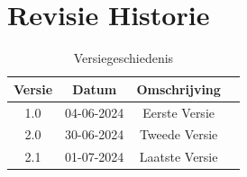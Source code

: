 \documentclass{article}
\begin{document}
  \tableofcontents
  \pagebreak 

  \section{Revisie Historie}
  \begin{table}[h]
      \centering
      \begin{tabular}{|c|c|c|p{5cm}|}
          \hline
          \textbf{Versie} & \textbf{Datum} & \textbf{Omschrijving}  \\
          \hline
          1.0  & 04-06-2024 & Eerste Versie \\
          \hline
          2.0 & 30-06-2024 & Tweede Versie \\
          \hline
          2.1 & 01-07-2024 & Laatste Versie \\
  
      \end{tabular}
      \caption{Versiegeschiedenis}
  \end{table}
  \pagebreak
\end{document}
